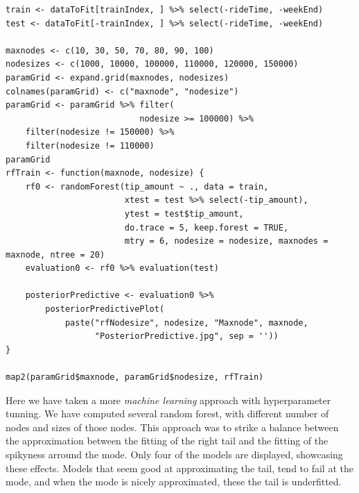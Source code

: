 \documentclass[11pt]{article}
\begin{document}
\begin{verbatim}
train <- dataToFit[trainIndex, ] %>% select(-rideTime, -weekEnd)
test <- dataToFit[-trainIndex, ] %>% select(-rideTime, -weekEnd)

maxnodes <- c(10, 30, 50, 70, 80, 90, 100)
nodesizes <- c(1000, 10000, 100000, 110000, 120000, 150000)
paramGrid <- expand.grid(maxnodes, nodesizes)
colnames(paramGrid) <- c("maxnode", "nodesize")
paramGrid <- paramGrid %>% filter(
                           nodesize >= 100000) %>%
    filter(nodesize != 150000) %>%
    filter(nodesize != 110000)
paramGrid
rfTrain <- function(maxnode, nodesize) {
    rf0 <- randomForest(tip_amount ~ ., data = train,
                        xtest = test %>% select(-tip_amount),
                        ytest = test$tip_amount,
                        do.trace = 5, keep.forest = TRUE,
                        mtry = 6, nodesize = nodesize, maxnodes = maxnode, ntree = 20)
    evaluation0 <- rf0 %>% evaluation(test)

    posteriorPredictive <- evaluation0 %>%
        posteriorPredictivePlot(
            paste("rfNodesize", nodesize, "Maxnode", maxnode,
                  "PosteriorPredictive.jpg", sep = ''))
}

map2(paramGrid$maxnode, paramGrid$nodesize, rfTrain)

\end{verbatim}

Here we have taken a more \emph{machine learning} approach with hyperparameter
tunning. We have computed several random forest, with different number
of nodes and sizes of those nodes. This approach was to strike a balance
between the approximation between the fitting of the right tail and the
fitting of the spikyness arround the mode. Only four of the models
are displayed, showcasing these effects. 
Models that seem good at approximating the tail, tend to fail at the mode,
and when the mode is nicely approximated, these the tail is underfitted.
\end{document}
